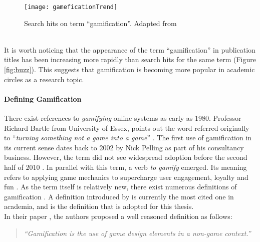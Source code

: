 \begin{figure}[h]
    \centering
    \texttt{[image: gameficationTrend]}
    \caption{Search hits on term ``gamification''. Adapted from \cite{hamari2014does}}
    \label{fig:pub}
\end{figure}\\
It is worth noticing that the appearance of the term ``gamification'' in publication titles has been increasing more rapidly than search hits for the same term (Figure \ref{fig:buzz}). This suggests that gamification is becoming more popular in academic circles as a research topic.%
\paragraph{Defining Gamification}
There exist references to \textit{gamifying} online systems as early as 1980. Professor Richard Bartle from University of Essex, points out the word referred originally to ``\textit{turning something not a game into a game}'' \cite{werbach2012win}. The first use of gamification in its current sense dates back to 2002 by Nick Pelling as part of his consultancy business. However, the term did not see widespread adoption before the second half of 2010 \cite{marczewski2013gamification}. In parallel with this term, a verb \textit{to gamify} emerged. Its meaning refers to applying game mechanics to supercharge user engagement, loyalty and fun \cite{toGamify}. As the term itself is relatively  new,  there exist numerous definitions of gamification \cite{deterding2011game, werbach2012win, kapp2012gamification}. A definition introduced by \cite{deterding2011game} is currently the most cited one in academia, and is the definition that is adopted for this thesis.
\pagebreak
\\In their paper \cite{deterding2011game}, the authors proposed a well reasoned definition as follows:
\begin{quotation}
\textit{``Gamification is the use of game design elements in a non-game context.''}
\end{quotation}
